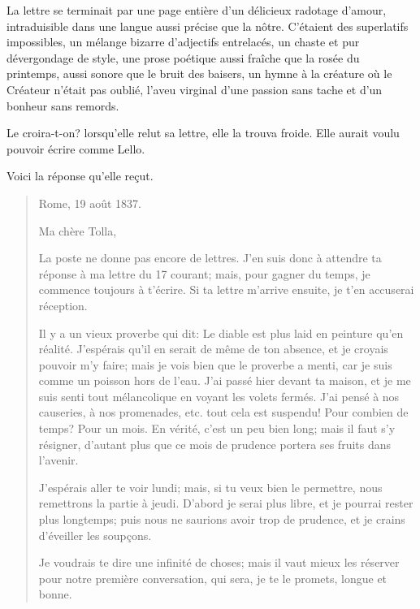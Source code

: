 La lettre se terminait par une page entière d'un délicieux radotage
d'amour, intraduisible dans une langue aussi précise que la nôtre.
C'étaient des superlatifs impossibles, un mélange bizarre d'adjectifs
entrelacés, un chaste et pur dévergondage de style, une prose poétique
aussi fraîche que la rosée du printemps, aussi sonore que le bruit des
baisers, un hymne à la créature où le Créateur n'était pas oublié,
l'aveu virginal d'une passion sans tache et d'un bonheur sans remords.

Le croira-t-on? lorsqu'elle relut sa lettre, elle la trouva froide. Elle
aurait voulu pouvoir écrire comme Lello.

Voici la réponse qu'elle reçut.

\begin{quote}
Rome, 19 août 1837.

Ma chère Tolla,

La poste ne donne pas encore de lettres. J'en suis donc à attendre ta
réponse à ma lettre du 17 courant; mais, pour gagner du temps, je
commence toujours à t'écrire. Si ta lettre m'arrive ensuite, je t'en
accuserai réception.

Il y a un vieux proverbe qui dit: Le diable est plus laid en peinture
qu'en réalité. J'espérais qu'il en serait de même de ton absence, et je
croyais pouvoir m'y faire; mais je vois bien que le proverbe a menti,
car je suis comme un poisson hors de l'eau. J'ai passé hier devant ta
maison, et je me suis senti tout mélancolique en voyant les volets
fermés. J'ai pensé à nos causeries, à nos promenades, etc. tout cela est
suspendu! Pour combien de temps? Pour un mois. En vérité, c'est un peu
bien long; mais il faut s'y résigner, d'autant plus que ce mois de
prudence portera ses fruits dans l'avenir.

J'espérais aller te voir lundi; mais, si tu veux bien le permettre, nous
remettrons la partie à jeudi. D'abord je serai plus libre, et je pourrai
rester plus longtemps; puis nous ne saurions avoir trop de prudence, et
je crains d'éveiller les soupçons.

Je voudrais te dire une infinité de choses; mais il vaut mieux les
réserver pour notre première conversation, qui sera, je te le promets,
longue et bonne.


\end{quote}
